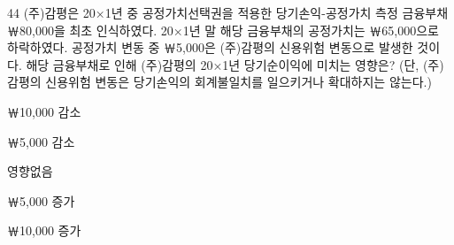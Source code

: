 \begin{question}{44}
(주)감평은 20×1년 중 공정가치선택권을 적용한 당기손익-공정가치 측정 금융부채 ￦80,000을 최초 인식하였다. 20×1년 말 해당 금융부채의 공정가치는 ￦65,000으로 하락하였다. 공정가치 변동 중 ￦5,000은 (주)감평의 신용위험 변동으로 발생한 것이다. 해당 금융부채로 인해 (주)감평의 20×1년 당기순이익에 미치는 영향은? (단, (주)감평의 신용위험 변동은 당기손익의 회계불일치를 일으키거나 확대하지는 않는다.)
\begin{choices}
  \item ￦10,000 감소
  \item ￦5,000 감소
  \item 영향없음
  \item ￦5,000 증가
  \item ￦10,000 증가
\end{choices}
\end{question}

